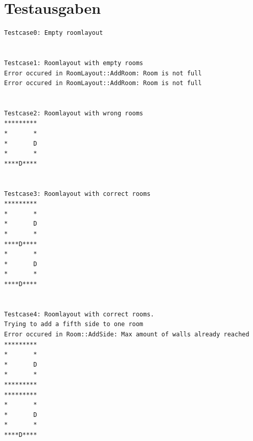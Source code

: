 \documentclass[12pt,a4paper]{article}
\begin{document}
\newpage

\newpage


\newpage


\newpage



\newpage
\section {Testausgaben} 

\begin {verbatim}
Testcase0: Empty roomlayout


Testcase1: Roomlayout with empty rooms
Error occured in RoomLayout::AddRoom: Room is not full
Error occured in RoomLayout::AddRoom: Room is not full


Testcase2: Roomlayout with wrong rooms
*********
*       *
*       D
*       *
****D****


Testcase3: Roomlayout with correct rooms
*********
*       *
*       D
*       *
****D****
*       *
*       D
*       *
****D****


Testcase4: Roomlayout with correct rooms.
Trying to add a fifth side to one room
Error occured in Room::AddSide: Max amount of walls already reached
*********
*       *
*       D
*       *
*********
*********
*       *
*       D
*       *
****D****
\end {verbatim}
\end{document}
